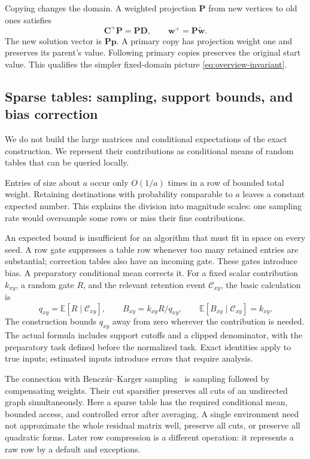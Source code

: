 \documentclass[11pt]{article}
\numberwithin{equation}{section}
\theoremstyle{definition}
\theoremstyle{remark}
\begin{document}
Copying changes the domain. A weighted projection \(\mathbf P\) from new vertices to old ones satisfies
\[
 \mathbf C^+\mathbf P=\mathbf P\mathbf D,\qquad
 \mathbf w^+=\mathbf P\widetilde{\mathbf w}.
\]
The new solution vector is \(\mathbf P\mathbf p\). A primary copy has projection weight one and preserves its parent's value. Following primary copies preserves the original start value. This qualifies the simpler fixed-domain picture \eqref{eq:overview-invariant}.

\subsection{Sparse tables: sampling, support bounds, and bias correction}

We do not build the large matrices and conditional expectations of the exact construction. We represent their contributions as conditional means of random tables that can be queried locally.

Entries of size about \(a\) occur only \(O(1/a)\) times in a row of bounded total weight. Retaining destinations with probability comparable to \(a\) leaves a constant expected number. This explains the division into magnitude scales: one sampling rate would oversample some rows or miss their fine contributions.

An expected bound is insufficient for an algorithm that must fit in space on every seed. A row gate suppresses a table row whenever too many retained entries are substantial; correction tables also have an incoming gate. These gates introduce bias. A preparatory conditional mean corrects it. For a fixed scalar contribution \(k_{xy}\), a random gate \(R\), and the relevant retention event \(\mathcal C_{xy}\), the basic calculation is
\[
 q_{xy}=\mathbb E[R\mid\mathcal C_{xy}],\qquad
 B_{xy}=k_{xy}R/q_{xy},\qquad
 \mathbb E[B_{xy}\mid\mathcal C_{xy}]=k_{xy}.
\]
The construction bounds \(q_{xy}\) away from zero wherever the contribution is needed. The actual formula includes support cutoffs and a clipped denominator, with the preparatory task defined before the normalized task. Exact identities apply to true inputs; estimated inputs introduce errors that require analysis.

The connection with Bencz\'ur--Karger sampling~\cite{BenczurKarger2015} is sampling followed by compensating weights. Their cut sparsifier preserves all cuts of an undirected graph simultaneously. Here a sparse table has the required conditional mean, bounded access, and controlled error after averaging. A single environment need not approximate the whole residual matrix well, preserve all cuts, or preserve all quadratic forms. Later row compression is a different operation: it represents a raw row by a default and exceptions.
\end{document}
